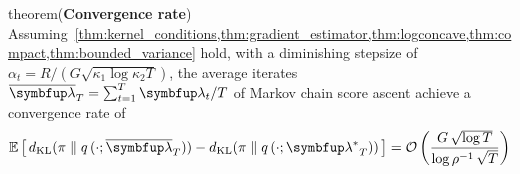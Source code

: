\begin{theoremEnd}{theorem}{(\textbf{Convergence rate})}\label{thm:convergence_rate}
  Assuming~\cref{thm:kernel_conditions,thm:gradient_estimator,thm:logconcave,thm:compact,thm:bounded_variance} hold, with a diminishing stepsize of \(\alpha_t = R / \left( G \sqrt{\kappa_1 \log \kappa_2 T} \right)\), the average iterates {\small\(\overline{\vlambda}_T = \sum^{T}_{t=1} \vlambda_{t} / T\)} of Markov chain score ascent achieve a convergence rate of
  {%
  \begin{align*}
    \E{ \DKL{\pi}{q\,(\cdot; {\overline{\vlambda}_{T}})} - \DKL{\pi}{q\left(\cdot; {\vlambda^*}_{T}\right)}}
    =
    \mathcal{O}\left(
    \frac{
      G \, \sqrt{\log T}
    }{
      \log \rho^{-1} \, \sqrt{T}
    } \right)  
  \end{align*}
  }
\end{theoremEnd}
